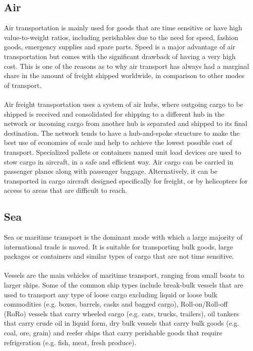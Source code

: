 \subsection{Air}
Air transportation is mainly used for goods that are time sensitive or have high value-to-weight ratios, including perishables due to the need for speed, fashion goods, emergency supplies and spare parts. Speed is a major advantage of air transportation but comes with the significant drawback of having a very high cost. This is one of the reasons as to why air transport has always had a marginal share in the amount of freight shipped worldwide, in comparison to other modes of transport.
\paragraph{}
Air freight transportation uses a system of air hubs, where outgoing cargo
to be shipped is received and consolidated for shipping to a different hub in the network or incoming cargo from another hub is separated and shipped to its final destination. The network tends to have a hub-and-spoke structure to make the best use of economies of scale and help to achieve the lowest possible cost of transport. Specialized pallets or containers named unit load devices are used to stow cargo in aircraft, in a safe and efficient way. Air cargo can be carried in passenger planes along with passenger baggage. Alternatively, it can be transported in cargo aircraft designed specifically for freight, or by helicopters for access to areas that are difficult to reach.
%
\subsection{Sea}
Sea or maritime transport is the dominant mode with which a large majority of international trade is moved. It is suitable for transporting bulk goods, large packages or containers and similar types of cargo that are not time sensitive.
\paragraph{}
Vessels are the main vehicles of maritime transport, ranging from small
boats to larger ships. Some of the common ship types include break-bulk vessels that are used to transport any type of loose cargo excluding liquid or loose bulk commodities (e.g. boxes, barrels, casks and bagged cargo), Roll-on/Roll-off (RoRo) vessels that carry wheeled cargo (e.g. cars, trucks, trailers), oil tankers that carry crude oil in liquid form, dry bulk vessels that carry bulk goods (e.g. coal, ore, grain) and reefer ships that carry perishable goods that require refrigeration (e.g. fish, meat, fresh produce).
